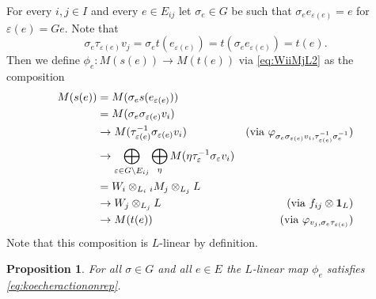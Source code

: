 \documentclass[a4paper,12pt,reqno]{amsart}
\theoremstyle{plain}
\newtheorem{proposition}[theorem]{Proposition}
\theoremstyle{remark}
\begin{document}
  For every $i,j\in I$ and every $e\in E_{ij}$ let $\sigma_e\in G$ be such that $\sigma_e e_{\varepsilon(e)}=e$ for $\varepsilon(e)=Ge$. Note that
  \[
  \sigma_e\tau_{\varepsilon(e)} v_j=
  \sigma_e t(e_{\varepsilon(e)})=
  t(\sigma_e e_{\varepsilon(e)})=
  t(e).
  \]
  Then we define $\phi_{e}\colon M(s(e))\to M(t(e))$ via \eqref{eq:WiiMjL2} as the composition
  \begin{align*}
      M(s(e))&= M(\sigma_e s(e_{\varepsilon(e)}))\\
      &=M(\sigma_e \sigma_{\varepsilon(e)} v_i)\\
      &\to M(\tau_{\varepsilon(e)}^{-1}\sigma_{\varepsilon(e)} v_i)&\text{(via $\varphi_{\sigma_e\sigma_{\varepsilon(e)}v_i,\tau_{\varepsilon(e)}^{-1}\sigma_e^{-1}}$)}\\
      &\to  \bigoplus_{\varepsilon\in G\backslash E_{ij}}
    \bigoplus_{\eta}
    M(\eta\tau_\varepsilon^{-1}\sigma_\varepsilon v_i)\\
    &=W_i \otimes_{L_i} {}_iM_j\otimes_{L_j}L\\
    &\to W_j \otimes_{L_j} L&\text{(via $f_{ij}\otimes{\bf1}_L$)}\\
    &\to M(t(e)) & \text{(via $\varphi_{v_j,\sigma_e\tau_{\varepsilon(e)}}$)}
  \end{align*}
  Note that this composition is $L$-linear by definition.
  \begin{proposition}
    For all $\sigma\in G$ and all $e\in E$ the $L$-linear map $\phi_e$ satisfies \eqref{eq:koecheractiononrep}.
  \end{proposition}
\end{document}
